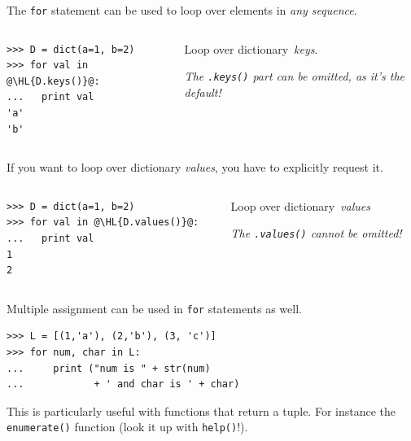 \documentclass[english,serif,mathserif,xcolor=pdftex,dvipsnames,table]{beamer}
\begin{document}
\begin{frame}[fragile]
  The \texttt{for} statement can be used to loop over elements in \emph{any sequence}.

  \+
  \begin{columns}[c]
    \begin{column}{0.5\textwidth}
\begin{lstlisting}
>>> D = dict(a=1, b=2)
>>> for val in @\HL{D.keys()}@:
...   print val
'a'
'b'
\end{lstlisting}
    \end{column}
    \begin{column}{0.4\textwidth}
      \raggedleft
      Loop over dictionary~\emph{keys}.

      \emph{The \texttt{.keys()} part can be omitted, as it's the
        default!}
    \end{column}
  \end{columns}
\end{frame}

\begin{frame}[fragile]
  If you want to loop over dictionary \emph{values}, you have to
  explicitly request it.

  \+
  \begin{columns}[c]
    \begin{column}{0.5\textwidth}
\begin{lstlisting}
>>> D = dict(a=1, b=2)
>>> for val in @\HL{D.values()}@:
...   print val
1
2
\end{lstlisting}
    \end{column}
    \begin{column}{0.4\textwidth}
      \raggedleft
      Loop over dictionary~\emph{values}

      \emph{The \texttt{.values()} cannot be omitted!}
    \end{column}
  \end{columns}
\end{frame}


\begin{frame}[fragile]
  Multiple assignment can be used in \texttt{for} statements as well.
\begin{lstlisting}
>>> L = [(1,'a'), (2,'b'), (3, 'c')]
>>> for num, char in L:
...     print ("num is " + str(num)
...            + ' and char is ' + char)
\end{lstlisting}

  \+
  This is particularly useful with functions that return a tuple.
  For instance the \texttt{enumerate()} function (look it up with
  \texttt{help()}!).
\end{frame}
\end{document}
